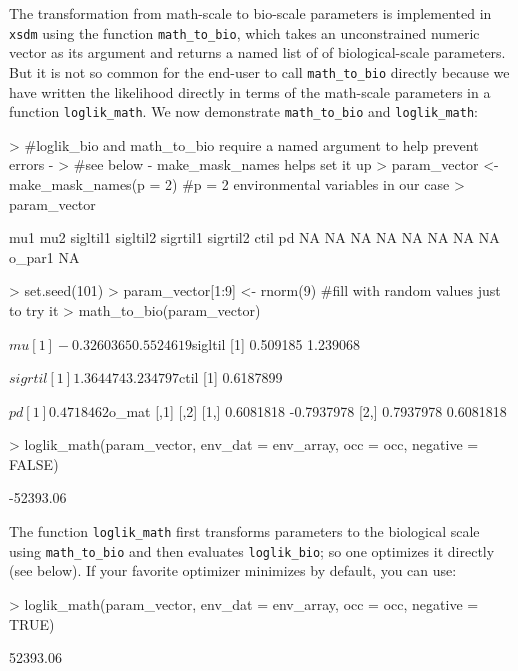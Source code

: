 \documentclass[11pt]{article}
\begin{document}
The transformation from math-scale to bio-scale parameters is implemented
in \texttt{xsdm} using the function \texttt{math\_to\_bio}, which takes an unconstrained
numeric vector as its argument and returns a named list of of biological-scale
parameters. But it is not so common for the end-user to call \texttt{math\_to\_bio}
directly because we have written the likelihood directly in terms of the math-scale
parameters in a function \texttt{loglik\_math}. We now demonstrate \texttt{math\_to\_bio}
and \texttt{loglik\_math}:
\begin{Schunk}
\begin{Sinput}
> #loglik_bio and math_to_bio require a named argument to help prevent errors - 
> #see below - make_mask_names helps set it up
> param_vector <- make_mask_names(p = 2) #p = 2 environmental variables in our case
> param_vector 
\end{Sinput}
\begin{Soutput}
     mu1      mu2 sigltil1 sigltil2 sigrtil1 sigrtil2     ctil       pd 
      NA       NA       NA       NA       NA       NA       NA       NA 
  o_par1 
      NA 
\end{Soutput}
\begin{Sinput}
> set.seed(101)
> param_vector[1:9] <- rnorm(9) #fill with random values just to try it
> math_to_bio(param_vector)
\end{Sinput}
\begin{Soutput}
$mu
[1] -0.3260365  0.5524619

$sigltil
[1] 0.509185 1.239068

$sigrtil
[1] 1.364474 3.234797

$ctil
[1] 0.6187899

$pd
[1] 0.4718462

$o_mat
          [,1]       [,2]
[1,] 0.6081818 -0.7937978
[2,] 0.7937978  0.6081818
\end{Soutput}
\begin{Sinput}
> loglik_math(param_vector, env_dat = env_array, occ = occ, negative = FALSE)
\end{Sinput}
\begin{Soutput}
[1] -52393.06
\end{Soutput}
\end{Schunk}
\noindent The function \texttt{loglik\_math} first transforms parameters to the 
biological scale using \texttt{math\_to\_bio} and
then evaluates \texttt{loglik\_bio}; so one optimizes it directly 
(see below). If your favorite optimizer minimizes by default, you can use:
\begin{Schunk}
\begin{Sinput}
> loglik_math(param_vector, env_dat = env_array, occ = occ, negative = TRUE)
\end{Sinput}
\begin{Soutput}
[1] 52393.06
\end{Soutput}
\end{Schunk}
\end{document}
